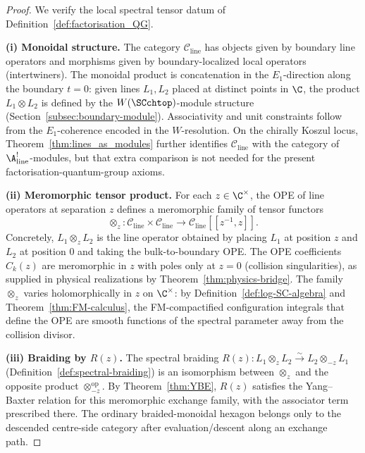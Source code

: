 \begin{proof}
We verify the local spectral tensor datum of
Definition~\ref{def:factorisation_QG}.

\medskip
\noindent\textbf{(i) Monoidal structure.}
The category $\mathcal{C}_{\mathrm{line}}$ has objects given by
boundary line operators and morphisms given by boundary-localized
local operators (intertwiners). The monoidal product is
concatenation in the $E_1$-direction along the boundary $t = 0$:
given lines $L_1, L_2$ placed at distinct points in $\C$, the
product $L_1 \otimes L_2$ is defined by the $W(\SCchtop)$-module
structure (Section~\ref{subsec:boundary-module}). Associativity and
unit constraints follow from the $E_1$-coherence encoded in the
$W$-resolution. On the chirally Koszul locus,
Theorem~\ref{thm:lines_as_modules} further identifies
$\mathcal{C}_{\mathrm{line}}$ with the category of
$\A^!_{\mathrm{line}}$-modules, but that extra comparison is not needed for the
present factorisation-quantum-group axioms.

\medskip
\noindent\textbf{(ii) Meromorphic tensor product.}
For each $z \in \C^\times$, the OPE of line operators at separation $z$ defines a meromorphic family of tensor functors
\[
\otimes_z \colon \mathcal{C}_{\mathrm{line}} \times \mathcal{C}_{\mathrm{line}} \longrightarrow \mathcal{C}_{\mathrm{line}}[[z^{-1}, z]].
\]
Concretely, $L_1 \otimes_z L_2$ is the line operator obtained by
placing $L_1$ at position $z$ and $L_2$ at position $0$ and taking
the bulk-to-boundary OPE. The OPE coefficients $C_k(z)$ are
meromorphic in $z$ with poles only at $z = 0$ (collision
singularities), as supplied in physical realizations by
Theorem~\ref{thm:physics-bridge}. The family $\otimes_z$ varies
holomorphically in $z$ on $\C^\times$: by
Definition~\ref{def:log-SC-algebra} and
Theorem~\ref{thm:FM-calculus}, the FM-compactified configuration
integrals that define the OPE are smooth functions of the spectral
parameter away from the collision divisor.

\medskip
\noindent\textbf{(iii) Braiding by $R(z)$.}
The spectral braiding
$R(z) \colon L_1 \otimes_z L_2 \xrightarrow{\sim}
L_2 \otimes_{-z} L_1$ \textup{(}Definition~\ref{def:spectral-braiding}\textup)
is an isomorphism between $\otimes_z$ and the opposite product
$\otimes_{-z}^{\mathrm{op}}$. By Theorem~\ref{thm:YBE}, $R(z)$
satisfies the Yang--Baxter relation for this meromorphic exchange
family, with the associator term prescribed there. The ordinary
braided-monoidal hexagon belongs only to the descended centre-side
category after evaluation/descent along an exchange path.


\end{proof}
